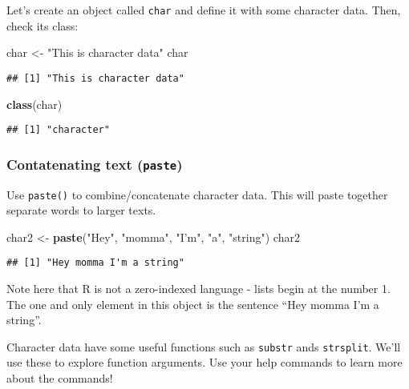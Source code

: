 \documentclass[]{article}
\newenvironment{Shaded}{\begin{snugshade}}{\end{snugshade}}
\newcommand{\KeywordTok}[1]{\textcolor[rgb]{0.13,0.29,0.53}{\textbf{#1}}}
\newcommand{\StringTok}[1]{\textcolor[rgb]{0.31,0.60,0.02}{#1}}
\newcommand{\NormalTok}[1]{#1}
\begin{document}
Let's create an object called \texttt{char} and define it with some
character data. Then, check its class:

\begin{Shaded}
\begin{Highlighting}[]
\NormalTok{char <-}\StringTok{ "This is character data"}
\NormalTok{char}
\end{Highlighting}
\end{Shaded}

\begin{verbatim}
## [1] "This is character data"
\end{verbatim}

\begin{Shaded}
\begin{Highlighting}[]
\KeywordTok{class}\NormalTok{(char)}
\end{Highlighting}
\end{Shaded}

\begin{verbatim}
## [1] "character"
\end{verbatim}

\subsubsection{\texorpdfstring{Contatenating text
(\texttt{paste})}{Contatenating text (paste)}}\label{contatenating-text-paste}

Use \texttt{paste()} to combine/concatenate character data. This will
paste together separate words to larger texts.

\begin{Shaded}
\begin{Highlighting}[]
\NormalTok{char2 <-}\StringTok{ }\KeywordTok{paste}\NormalTok{(}\StringTok{"Hey"}\NormalTok{, }\StringTok{"momma"}\NormalTok{, }\StringTok{"I'm"}\NormalTok{, }\StringTok{"a"}\NormalTok{, }\StringTok{"string"}\NormalTok{)}
\NormalTok{char2}
\end{Highlighting}
\end{Shaded}

\begin{verbatim}
## [1] "Hey momma I'm a string"
\end{verbatim}

Note here that R is not a zero-indexed language - lists begin at the
number 1. The one and only element in this object is the sentence ``Hey
momma I'm a string''.

Character data have some useful functions such as \texttt{substr} ands
\texttt{strsplit}. We'll use these to explore function arguments. Use
your help commands to learn more about the commands!
\end{document}
